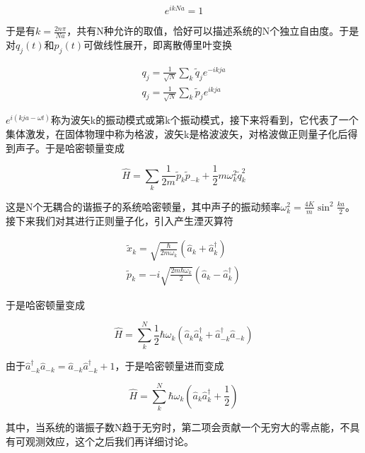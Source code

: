 \begin{equation}
    e^{ikNa}=1
\end{equation}

于是有$k=\frac{2n\pi}{Na}$，共有N种允许的取值，恰好可以描述系统的N个独立自由度。于是对$q_j(t)$和$p_j(t)$可做线性展开，即离散傅里叶变换

\begin{equation}
	\begin{array}{lr}
		q_j=\frac{1}{\sqrt{N}}\sum_{k}\tilde{q}_je^{-ikja} \\
		q_j=\frac{1}{\sqrt{N}}\sum_{k}\tilde{p}_je^{ikja}
	\end{array}
\end{equation}

$e^{i(kja-\omega t)}$称为波矢k的振动模式或第k个振动模式，接下来将看到，它代表了一个集体激发，在固体物理中称为格波，波矢k是格波波矢，对格波做正则量子化后得到声子。于是哈密顿量变成

\begin{equation}
	\hat{H}=\sum_{k}\frac{1}{2m}\tilde{p}_k\tilde{p}_{-k}+\frac{1}{2}m\omega_k^2\tilde{q}_k^2
\end{equation}

这是N个无耦合的谐振子的系统哈密顿量，其中声子的振动频率$\omega_k^2=\frac{4K}{m}\sin^2\frac{ka}{2}$。接下来我们对其进行正则量子化，引入产生湮灭算符

\begin{equation}
	\begin{array}{lr}
		\tilde{x}_k=\sqrt{\frac{\hbar}{2m\omega_k}}(\hat{a}_k+\hat{a}_k^\dagger) \\
		\tilde{p}_k=-i\sqrt{\frac{2m\hbar\omega_k}{2}}(\hat{a}_k-\hat{a}_k^\dagger)
	\end{array}
\end{equation}

于是哈密顿量变成

\begin{equation}
	\hat{H}=\sum_{k}^N\frac{1}{2}\hbar\omega_k(\hat{a}_k\hat{a}_k^\dagger+\hat{a}_{-k}^\dagger\hat{a}_{-k})
\end{equation}

由于$\hat{a}_{-k}^\dagger\hat{a}_{-k}=\hat{a}_{-k}\hat{a}_{-k}^\dagger+1$，于是哈密顿量进而变成

\begin{equation}
	\hat{H}=\sum_{k}^N\hbar\omega_k(\hat{a}_k\hat{a}_k^\dagger+\frac{1}{2})
\end{equation}

其中，当系统的谐振子数N趋于无穷时，第二项会贡献一个无穷大的零点能，不具有可观测效应，这个之后我们再详细讨论。





